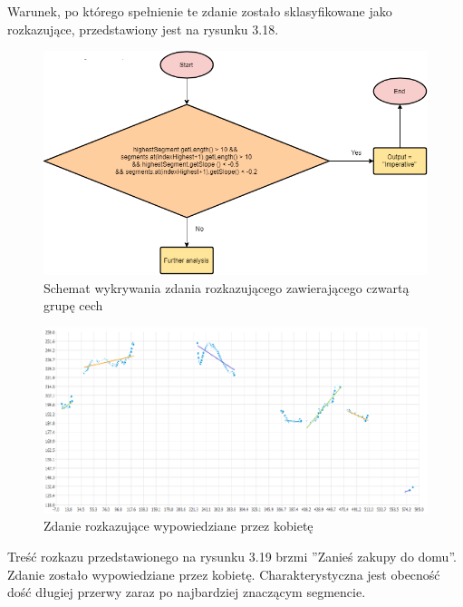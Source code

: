 \documentclass[a4paper,12 pt]{report}
\begin{document}
Warunek, po którego spełnienie te zdanie zostało sklasyfikowane jako rozkazujące, przedstawiony jest na rysunku 3.18.
 \FloatBarrier
\begin{figure}[h]
\centering
\includegraphics[scale=0.9]{Imperative4.png}
\caption{Schemat wykrywania zdania rozkazującego zawierającego czwartą grupę cech}
\end{figure}
\FloatBarrier
 \FloatBarrier
\begin{figure}[h]
\centering
\includegraphics[scale=0.85]{rozkaz_5_kobieta.pdf}
\caption{Zdanie rozkazujące wypowiedziane przez kobietę}
\end{figure}
\FloatBarrier
Treść rozkazu przedstawionego na rysunku 3.19 brzmi ''Zanieś zakupy do domu''. Zdanie zostało wypowiedziane przez kobietę. Charakterystyczna jest obecność dość długiej przerwy zaraz po najbardziej znaczącym segmencie.
\end{document}
